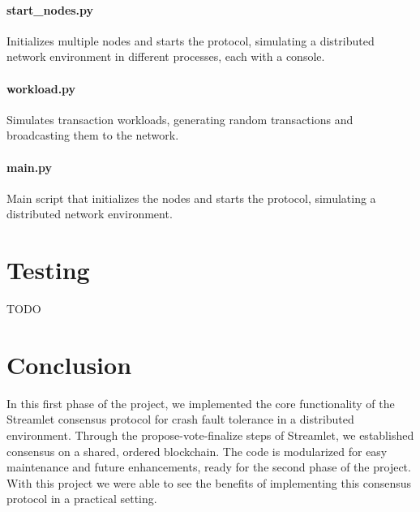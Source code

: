 \paragraph{start\_nodes.py}
Initializes multiple nodes and starts the protocol, simulating a distributed network environment in different processes, each with a console.

\paragraph{workload.py}
Simulates transaction workloads, generating random transactions and broadcasting them to the network.

\paragraph{main.py}
Main script that initializes the nodes and starts the protocol, simulating a distributed network environment.

\clearpage

\section{Testing}

TODO

\section{Conclusion}

In this first phase of the project, we implemented the core functionality of the Streamlet consensus protocol for crash fault tolerance in a distributed environment. Through the propose-vote-finalize steps of Streamlet, we established consensus on a shared, ordered blockchain. The code is modularized for easy maintenance and future enhancements, ready for the second phase of the project. With this project we were able to see the benefits of implementing this consensus protocol in a practical setting.